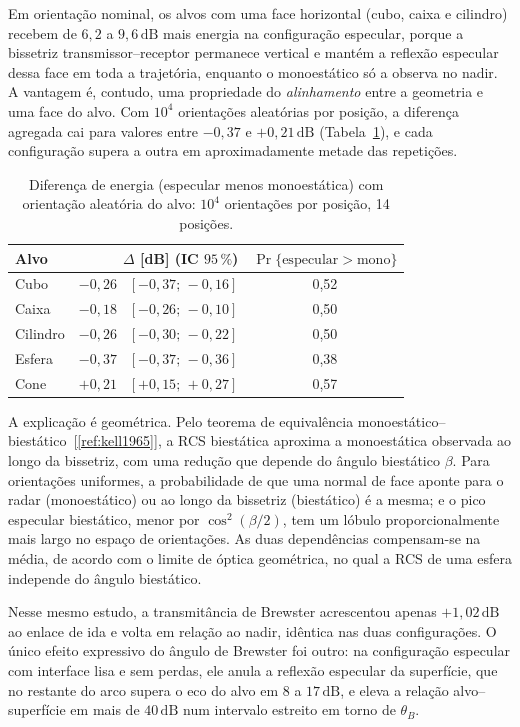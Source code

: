 \documentclass[12pt,a4paper,oneside]{book}
\theoremstyle{remark}
\newcommand{\dB}{\,\mathrm{dB}}
\newcommand{\citar}[1]{[\ref{ref:#1}]}
\theoremstyle{plain}
\theoremstyle{definition}
\begin{document}
Em orientação nominal, os alvos com uma face horizontal (cubo, caixa e cilindro)
recebem de $6,2$ a $9,6\dB$ mais energia na configuração especular, porque a
bissetriz transmissor--receptor permanece vertical e mantém a reflexão especular
dessa face em toda a trajetória, enquanto o monoestático só a observa no nadir.
A vantagem é, contudo, uma propriedade do \emph{alinhamento} entre a geometria e
uma face do alvo. Com $10^4$ orientações aleatórias por posição, a diferença
agregada cai para valores entre $-0,37$ e $+0,21\dB$
(Tabela~\ref{tab:mc_potencia}), e cada configuração supera a outra em
aproximadamente metade das repetições.

\begin{table}[H]
\centering
\caption{Diferença de energia (especular menos monoestática) com orientação
aleatória do alvo: $10^4$ orientações por posição, 14 posições.}
\label{tab:mc_potencia}
\begin{tabular}{@{}lrc@{}}
\toprule
Alvo & $\Delta$ [dB] (IC $95\,\%$) & $\Pr\{\text{especular}>\text{mono}\}$ \\
\midrule
Cubo     & $-0,26$ \ $[-0,37;\,-0,16]$ & 0,52 \\
Caixa    & $-0,18$ \ $[-0,26;\,-0,10]$ & 0,50 \\
Cilindro & $-0,26$ \ $[-0,30;\,-0,22]$ & 0,50 \\
Esfera   & $-0,37$ \ $[-0,37;\,-0,36]$ & 0,38 \\
Cone     & $+0,21$ \ $[+0,15;\,+0,27]$ & 0,57 \\
\bottomrule
\end{tabular}
\end{table}

A explicação é geométrica. Pelo teorema de equivalência
monoestático--biestático~\citar{kell1965}, a RCS biestática aproxima a
monoestática observada ao longo da bissetriz, com uma redução que depende do
ângulo biestático $\beta$. Para orientações uniformes, a probabilidade de que
uma normal de face aponte para o radar (monoestático) ou ao longo da bissetriz
(biestático) é a mesma; e o pico especular biestático, menor por
$\cos^2(\beta/2)$, tem um lóbulo proporcionalmente mais largo no espaço de
orientações. As duas dependências compensam-se na média, de acordo com o
limite de óptica geométrica, no qual a RCS de uma esfera independe do ângulo
biestático.

Nesse mesmo estudo, a transmitância de Brewster acrescentou apenas $+1,02\dB$
ao enlace de ida e volta em relação ao nadir, idêntica nas duas
configurações. O único efeito expressivo do ângulo de Brewster foi outro: na
configuração especular com interface lisa e sem perdas, ele anula a reflexão
especular da superfície, que no restante do arco supera o eco do alvo em $8$ a
$17\dB$, e eleva a relação alvo--superfície em mais de $40\dB$ num intervalo
estreito em torno de $\theta_B$.
\end{document}
